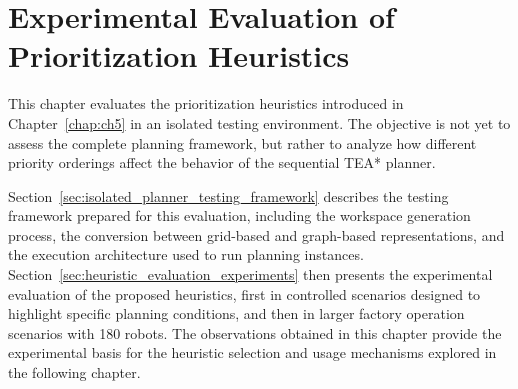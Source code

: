 \chapter{Experimental Evaluation of Prioritization Heuristics}
\label{chap:ch6}
\hspace{\parindent}
This chapter evaluates the prioritization heuristics introduced in Chapter~\ref{chap:ch5} in an
isolated testing environment. The objective is not yet to assess the complete planning framework,
but rather to analyze how different priority orderings affect the behavior of the sequential TEA*
planner.

Section~\ref{sec:isolated_planner_testing_framework} describes the testing framework
prepared for this evaluation, including the workspace generation process, the conversion between
grid-based and graph-based representations, and the execution architecture used to run planning
instances. Section~\ref{sec:heuristic_evaluation_experiments} then presents the experimental
evaluation of the proposed heuristics, first in controlled scenarios designed to highlight specific
planning conditions, and then in larger factory operation scenarios with 180 robots. The observations
obtained in this chapter provide the experimental basis for the heuristic selection and usage
mechanisms explored in the following chapter.

